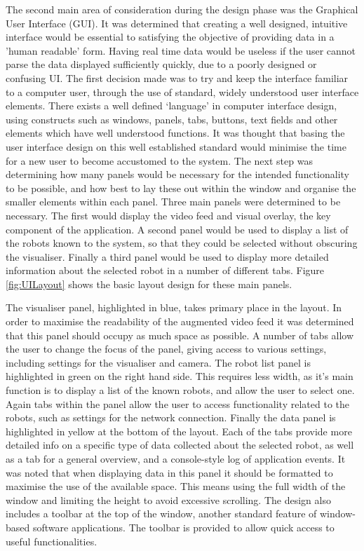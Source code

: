 The second main area of consideration during the design phase was the Graphical User Interface (GUI). It was determined that creating a well designed, intuitive interface would be essential to satisfying the objective of providing data in a 'human readable' form. Having real time data would be useless if the user cannot parse the data displayed sufficiently quickly, due to a poorly designed or confusing UI. The first decision made was to try and keep the interface familiar to a computer user, through the use of standard, widely understood user interface elements. There exists a well defined `language' in computer interface design, using constructs such as windows, panels, tabs, buttons, text fields and other elements which have well understood functions. It was thought that basing the user interface design on this well established standard would minimise the time for a new user to become accustomed to the system. The next step was determining how many panels would be necessary for the intended functionality to be possible, and how best to lay these out within the window and organise the smaller elements within each panel. Three main panels were determined to be necessary. The first would display the video feed and visual overlay, the key component of the application. A second panel would be used to display a list of the robots known to the system, so that they could be selected without obscuring the visualiser. Finally a third panel would be used to display more detailed information about the selected robot in a number of different tabs. Figure \ref{fig:UILayout} shows the basic layout design for these main panels.

The visualiser panel, highlighted in blue, takes primary place in the layout. In order to maximise the readability of the augmented video feed it was determined that this panel should occupy as much space as possible. A number of tabs allow the user to change the focus of the panel, giving access to various settings, including settings for the visualiser and camera. The robot list panel is highlighted in green on the right hand side. This requires less width, as it's main function is to display a list of the known robots, and allow the user to select one. Again tabs within the panel allow the user to access functionality related to the robots, such as settings for the network connection. Finally the data panel is highlighted in yellow at the bottom of the layout. Each of the tabs provide more detailed info on a specific type of data collected about the selected robot, as well as a tab for a general overview, and a console-style log of application events. It was noted that when displaying data in this panel it should be formatted to maximise the use of the available space. This means using the full width of the window and limiting the height to avoid excessive scrolling. The design also includes a toolbar at the top of the window, another standard feature of window-based software applications. The toolbar is provided to allow quick access to useful functionalities.

